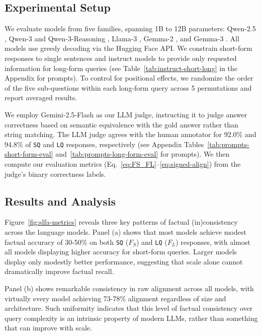 \documentclass[11pt]{article}
\begin{document}
\subsection{Experimental Setup}
We evaluate models from five families, spanning 1B to 12B parameters: Qwen-2.5 \citep{Yang2024Qwen25TR}, Qwen-3 and Qwen-3-Reasoning \citep{yang2025qwen3}, Llama-3 \citep{grattafiori2024llama}, Gemma-2 \citep{team2024gemma}, and Gemma-3 \citep{team2025gemma}. All models use greedy decoding via the Hugging Face API. We constrain short-form responses to single sentences and instruct models to provide only requested information for long-form queries (see Table~\ref{tab:instruct-short-long} in the Appendix for prompts). To control for positional effects, we randomize the order of the five sub-questions within each long-form query across 5 permutations and report averaged results.

We employ Gemini-2.5-Flash \citep{team2023gemini} as our LLM judge, instructing it to judge answer correctness based on semantic equivalence with the gold answer rather than string matching. The LLM judge agrees with the human annotator for 92.0\% and 94.8\% of \texttt{SQ} and \texttt{LQ} responses, respectively (see Appendix Tables~\ref{tab:prompts-short-form-eval} and~\ref{tab:prompts-long-form-eval} for prompts). We then compute our evaluation metrics (Eq.~\ref{eq:FS_FL}--\ref{eq:signed-align}) from the judge's binary correctness labels. 

\subsection{Results and Analysis}

Figure~\ref{fig:slfa-metrics} reveals three key patterns of factual (in)consistency across the language models. Panel (a) shows that most models achieve modest factual accuracy of 30-50\% on both \texttt{SQ} ($F_S$) and \texttt{LQ} ($F_L$) responses, with almost all models displaying higher accuracy for short-form queries. Larger models display only modestly better performance, suggesting that scale alone cannot dramatically improve factual recall.

Panel (b) shows remarkable consistency in raw alignment across all models, with virtually every model achieving 73-78\% alignment regardless of size and architecture. Such uniformity indicates that this level of factual consistency over query complexity is an intrinsic property of modern LLMs, rather than something that can improve with scale.
\end{document}
